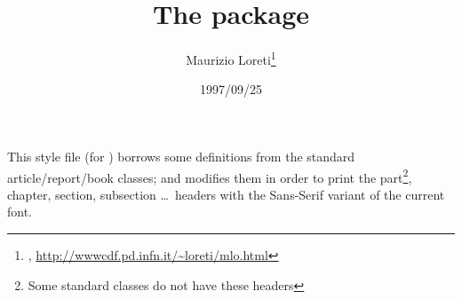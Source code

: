 \documentclass[pagesize=auto, fontsize=14pt, DIV=9, parskip=half]{scrartcl}
\title{The \pkg{sfheaders} package}
\author{Maurizio Loreti\thanks{\mail{loreti@padova.infn.it}, \url{http://wwwcdf.pd.infn.it/\~loreti/mlo.html}}}
\date{1997/09/25}
\newcommand*{\cls}[1]{\textsf{#1}}
\begin{document}
\maketitle

This style file  (for \LaTeXe)  borrows some definitions  from the
standard \cls{article}/\cls{report}/\cls{book} classes; and modifies them in order to
print the part\footnote{Some standard classes do not have these headers\label{fn:headers}}, chapter, section, subsection \dots\ headers with
the Sans-Serif variant of the current font.
\end{document}

